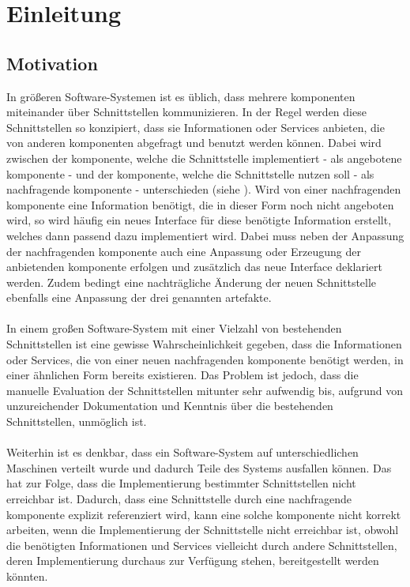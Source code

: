 \chapter{Einleitung}
\section{Motivation}
In größeren Software-Systemen ist es üblich, dass mehrere \gls{komponente}n miteinander über Schnittstellen kommunizieren. In der Regel werden diese Schnittstellen so konzipiert, dass sie Informationen oder Services anbieten, die von anderen \gls{komponente}n abgefragt und benutzt werden können. Dabei wird zwischen der \gls{komponente}, welche die Schnittstelle implementiert - als angebotene \Gls{komponente} - und der \gls{komponente}, welche die Schnittstelle nutzen soll - als nachfragende \gls{komponente} - unterschieden (siehe ). 
\noindent
Wird von einer nachfragenden \gls{komponente} eine Information benötigt, die in dieser Form noch nicht angeboten wird, so wird häufig ein neues \Gls{Interface} für diese benötigte Information erstellt, welches dann passend dazu implementiert wird. Dabei muss neben der Anpassung der nachfragenden \gls{komponente} auch eine Anpassung oder Erzeugung der anbietenden \gls{komponente} erfolgen und zusätzlich das neue \Gls{Interface} deklariert werden. Zudem bedingt eine nachträgliche Änderung der neuen Schnittstelle ebenfalls eine Anpassung der drei genannten \gls{artefakt}e.\\\\
In einem großen Software-System mit einer Vielzahl von bestehenden Schnittstellen ist eine gewisse Wahrscheinlichkeit gegeben, dass die Informationen oder Services, die von einer neuen nachfragenden \gls{komponente} benötigt werden, in einer ähnlichen Form bereits existieren. Das Problem ist jedoch, dass die manuelle Evaluation der Schnittstellen mitunter sehr aufwendig bis, aufgrund von unzureichender Dokumentation und Kenntnis über die bestehenden Schnittstellen, unmöglich ist.
\\\\
Weiterhin ist es denkbar, dass ein Software-System auf unterschiedlichen Maschinen verteilt wurde und dadurch Teile des Systems ausfallen können. Das hat zur Folge, dass die Implementierung bestimmter Schnittstellen nicht erreichbar ist. Dadurch, dass eine Schnittstelle durch eine nachfragende \gls{komponente} explizit referenziert wird, kann eine solche \gls{komponente} nicht korrekt arbeiten, wenn die Implementierung der Schnittstelle nicht erreichbar ist, obwohl die benötigten Informationen und Services vielleicht durch andere Schnittstellen, deren Implementierung durchaus zur Verfügung stehen, bereitgestellt werden könnten.
